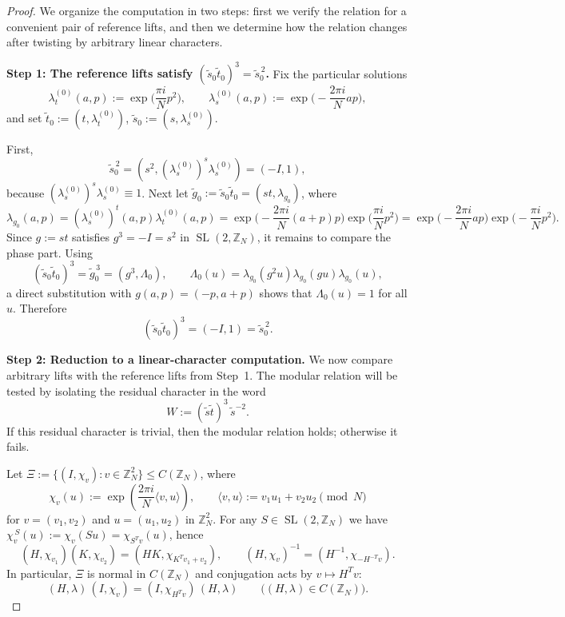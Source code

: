 \documentclass[11pt, reqno]{amsart}
\theoremstyle{definition}
\theoremstyle{remark}
\newcommand{\Z}{\mathbb{Z}}
\DeclareMathOperator{\SL}{SL}
\begin{document}
\begin{proof}
We organize the computation in two steps: first we verify the relation for a convenient pair of reference lifts, and then we determine how the relation changes after twisting by arbitrary linear characters.

\smallskip
\noindent\textbf{Step 1: The reference lifts satisfy $(\tilde s_0\tilde t_0)^3=\tilde s_0^{\,2}$.}
Fix the particular solutions
\[
\lambda_t^{(0)}(a,p):=\exp\!\Big(\frac{\pi i}{N}p^2\Big),\qquad
\lambda_s^{(0)}(a,p):=\exp\!\Big(-\frac{2\pi i}{N}ap\Big),
\]
and set $\tilde t_0:=(t,\lambda_t^{(0)})$, $\tilde s_0:=(s,\lambda_s^{(0)})$.

First,
\[
\tilde s_0^{\,2}=(s^2,(\lambda_s^{(0)})^{s}\lambda_s^{(0)})=(-I,1),
\]
because $(\lambda_s^{(0)})^{s}\lambda_s^{(0)}\equiv 1$. Next let $\tilde g_0:=\tilde s_0\tilde t_0=(st,\lambda_{g_0})$, where
\[
\lambda_{g_0}(a,p)=(\lambda_s^{(0)})^{t}(a,p)\lambda_t^{(0)}(a,p)
=\exp\!\Big(-\frac{2\pi i}{N}(a+p)p\Big)\exp\!\Big(\frac{\pi i}{N}p^2\Big)
=\exp\!\Big(-\frac{2\pi i}{N}ap\Big)\exp\!\Big(-\frac{\pi i}{N}p^2\Big).
\]
Since $g:=st$ satisfies $g^3=-I=s^2$ in $\SL(2,\Z_N)$, it remains to compare the phase part. Using
\[
(\tilde s_0\tilde t_0)^3=\tilde g_0^{\,3}=(g^3,\Lambda_0),\qquad
\Lambda_0(u)=\lambda_{g_0}(g^2u)\lambda_{g_0}(gu)\lambda_{g_0}(u),
\]
a direct substitution with $g(a,p)=(-p,a+p)$ shows that $\Lambda_0(u)=1$ for all $u$. Therefore
\[
(\tilde s_0\tilde t_0)^3=(-I,1)=\tilde s_0^{\,2}.
\]

\smallskip
\noindent\textbf{Step 2: Reduction to a linear-character computation.}
We now compare arbitrary lifts with the reference lifts from Step~1. The modular relation will be tested by isolating the residual character in the word
\[
W:=(\tilde s\tilde t)^3\,\tilde s^{-2}.
\]
If this residual character is trivial, then the modular relation holds; otherwise it fails.

Let $\Xi:=\{(I,\chi_v):v\in\Z_N^2\}\le C(\Z_N)$, where
\[
\chi_v(u):=\exp\!\left(\frac{2\pi i}{N}\langle v,u\rangle\right),
\qquad
\langle v,u\rangle := v_1u_1+v_2u_2 \pmod N
\]
for $v=(v_1,v_2)$ and $u=(u_1,u_2)$ in $\Z_N^2$.
For any $S\in \SL(2,\Z_N)$ we have $\chi_v^{\,S}(u):=\chi_v(Su)=\chi_{S^Tv}(u)$,
hence
\begin{equation}\label{eq:char-mult}
(H,\chi_{v_1})(K,\chi_{v_2})=(HK,\chi_{K^Tv_1+v_2}),
\qquad
(H,\chi_v)^{-1}=(H^{-1},\chi_{-H^{-T}v}).
\end{equation}
In particular, $\Xi$ is normal in $C(\Z_N)$ and conjugation acts by $v\mapsto H^Tv$:
\begin{equation}\label{eq:char-conj}
(H,\lambda)\,(I,\chi_v)=(I,\chi_{H^Tv})\,(H,\lambda)\qquad\bigl((H,\lambda)\in C(\Z_N)\bigr).
\end{equation}


\end{proof}
\end{document}
